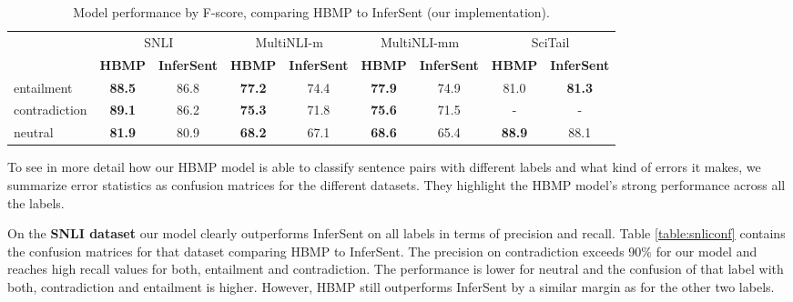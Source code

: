 \documentclass{nle}
\begin{document}
\begin{table}[ht!]
\begin{tabular}{l|cc|cc|cc|cc}
\hline
 & \multicolumn{2}{c|}{SNLI} & \multicolumn{2}{c|}{MultiNLI-m} &\multicolumn{2}{c|}{MultiNLI-mm} &\multicolumn{2}{c}{SciTail}
\\
& \tiny\bf HBMP &\tiny\bf InferSent &\tiny\bf HBMP &\tiny\bf InferSent &\tiny\bf HBMP &\tiny\bf InferSent &\tiny\bf HBMP &\tiny\bf InferSent \\
\hline
entailment & \bf 88.5 & 86.8 & \bf 77.2 & 74.4 &\bf 77.9 & 74.9 & 81.0 & \bf 81.3\\
contradiction & \bf 89.1 & 86.2 & \bf 75.3 & 71.8 &\bf 75.6 & 71.5 & -& -\\
neutral  & \bf 81.9  & 80.9 &  \bf 68.2 & 67.1 & \bf 68.6 & 65.4 &\bf 88.9 & 88.1\\
\hline
\end{tabular}
\caption{\label{table:LabelAccuracy} Model performance by F-score, comparing HBMP to InferSent \citep{infersent} (our implementation).}
\end{table}

To see in more detail how our HBMP model is able to classify sentence pairs with different labels and what kind of errors it makes, we summarize error statistics as confusion matrices for the different datasets.  They highlight the HBMP model's strong performance across all the labels.

On the \textbf{SNLI dataset} our model clearly outperforms InferSent on all labels in terms of precision and recall. Table \ref{table:snliconf} contains the confusion matrices for that dataset comparing HBMP to InferSent. The precision on contradiction exceeds 90\% for our model and reaches high recall values for both, entailment and contradiction. The performance is lower for neutral and the confusion of that label with both, contradiction and entailment is higher. However, HBMP still outperforms InferSent by a similar margin as for the other two labels.
\end{document}
